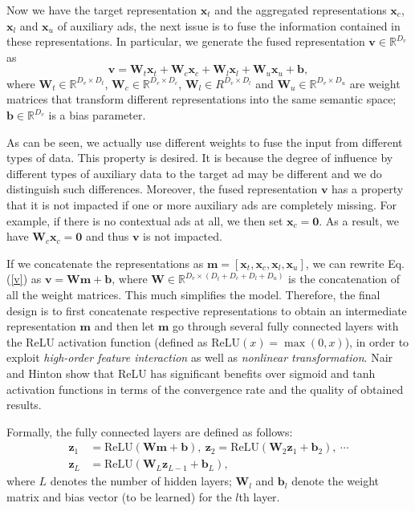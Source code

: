 \documentclass[sigconf]{acmart}
\begin{document}
Now we have the target representation $\mathbf{x}_t$ and the aggregated representations $\mathbf{x}_c$, $\mathbf{x}_l$ and $\mathbf{x}_u$ of auxiliary ads, the next issue is to fuse the information contained in these representations. In particular, we generate the fused representation $\mathbf{v} \in \mathbb{R}^{D_v}$ as
\begin{equation} \label{v}
\mathbf{v} = \mathbf{W}_t \mathbf{x}_t + \mathbf{W}_c \mathbf{x}_c + \mathbf{W}_l \mathbf{x}_l + \mathbf{W}_u \mathbf{x}_u + \mathbf{b},
\end{equation}
where $\mathbf{W}_t \in \mathbb{R}^{D_v \times D_t}$, $\mathbf{W}_c \in \mathbb{R}^{D_v \times D_c}$, $\mathbf{W}_l \in R^{D_v \times D_l}$ and $\mathbf{W}_u \in \mathbb{R}^{D_v \times D_u}$ are weight matrices that transform different representations into the same semantic space; $\mathbf{b} \in \mathbb{R}^{D_v}$ is a bias parameter.

As can be seen, we actually use different weights to fuse the input from different types of data. This property is desired. It is because the degree of influence by different types of auxiliary data to the target ad may be different and we do distinguish such differences. Moreover, the fused representation $\mathbf{v}$ has a property that it is not impacted if one or more auxiliary ads are completely missing. For example, if there is no contextual ads at all, we then set $\mathbf{x}_c = \mathbf{0}$. As a result, we have $\mathbf{W}_c \mathbf{x}_c = \mathbf{0}$ and thus $\mathbf{v}$ is not impacted.

If we concatenate the representations as $\mathbf{m} = [\mathbf{x}_t, \mathbf{x}_c, \mathbf{x}_l, \mathbf{x}_u]$, we can rewrite Eq. (\ref{v}) as $\mathbf{v} = \mathbf{W} \mathbf{m} + \mathbf{b}$, where $\mathbf{W} \in \mathbb{R}^{D_v \times (D_t + D_c + D_l + D_u)}$ is the concatenation of all the weight matrices.
This much simplifies the model. Therefore, the final design is to first concatenate respective representations to obtain an intermediate representation $\mathbf{m}$ and then let $\mathbf{m}$ go through several fully connected layers with the ReLU activation function (defined as $\mathrm{ReLU}(x) = \max(0, x)$), in order to exploit \emph{high-order feature interaction} as well as \emph{nonlinear transformation}.
Nair and Hinton \cite{nair2010rectified} show that ReLU has significant benefits over sigmoid and tanh activation functions in terms of the convergence rate and the quality of obtained results.

Formally, the fully connected layers are defined as follows:
\begin{align}
\mathbf{z}_1 & = \mathrm{ReLU}(\mathbf{W} \mathbf{m} + \mathbf{b}), \
\mathbf{z}_2 = \mathrm{ReLU}(\mathbf{W}_2 \mathbf{z}_1 + \mathbf{b}_2), \ \cdots \nonumber \\
\mathbf{z}_L & = \mathrm{ReLU}(\mathbf{W}_L \mathbf{z}_{L-1} + \mathbf{b}_L),  \nonumber
\end{align}
where $L$ denotes the number of hidden layers; $\mathbf{W}_l$ and $\mathbf{b}_l$ denote the weight matrix and bias vector (to be learned) for the $l$th layer.
\end{document}
